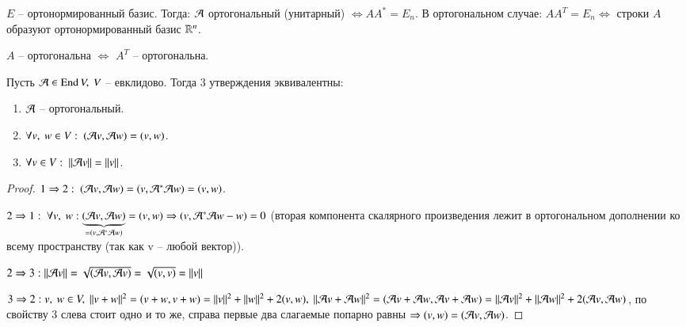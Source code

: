\documentclass[main]{subfiles}
\begin{document}
$E$ -- ортонормированный базис. Тогда: $\mathcal{A}$ ортогональный (унитарный) $\Leftrightarrow AA^* = E_n$.
В ортогональном случае: $AA^T = E_n \Leftrightarrow$ строки $A$ образуют ортонормированный базис $\mathbb{R}^n$.

\begin{remark}
    $A$ -- ортогональна $\Leftrightarrow$ $A^T$ -- ортогональна.
\end{remark}

\begin{proposition}
    Пусть $\mathcal{A} \in \operatorname{End} V, \ V$ -- евклидово. Тогда 3 утверждения эквивалентны:
    \begin{enumerate}
        \item $\mathcal{A}$ -- ортогональный.
        \item $\forall v, \ w \in V: \ (\mathcal{A} v, \mathcal{A} w) = (v, w)$.
        \item $\forall v \in V: \ ||\mathcal{A} v|| = ||v||$.
    \end{enumerate}
\end{proposition}

\begin{proof}
    $1 \Rightarrow 2: \ (\mathcal{A} v, \mathcal{A} w) = (v, \mathcal{A}^* \mathcal{A} w) = (v, w)$.

    $2 \Rightarrow 1: \ \forall v, \ w: \underbrace{(\mathcal{A} v, \mathcal{A} w)}_{= (v, \mathcal{A}^* \mathcal{A} w)} = (v, w) \Rightarrow (v, \mathcal{A}^* \mathcal{A} w - w) = 0$ (вторая компонента скалярного произведения лежит в ортогональном дополнении ко всему пространству (так как v -- любой вектор)).

    $2 \Rightarrow 3: ||\mathcal{A} v|| = \sqrt{(\mathcal{A} v, \mathcal{A} v)} = \sqrt{(v, v)} = ||v||$

    $3 \Rightarrow 2: v, \ w \in V, \ ||v + w||^2 = (v+w, v+w) = ||v||^2 + ||w||^2 + 2(v, w), \
        ||\mathcal{A} v + \mathcal{A} w||^2 = (\mathcal{A} v + \mathcal{A} w, \mathcal{A} v + \mathcal{A} w) = ||\mathcal{A} v||^2 + ||\mathcal{A} w||^2 + 2(\mathcal{A} v, \mathcal{A} w)$,
    по свойству 3 слева стоит одно и то же, справа первые два слагаемые попарно равны $\Rightarrow (v, w) = (\mathcal{A} v, \mathcal{A} w)$.
\end{proof}
\end{document}
